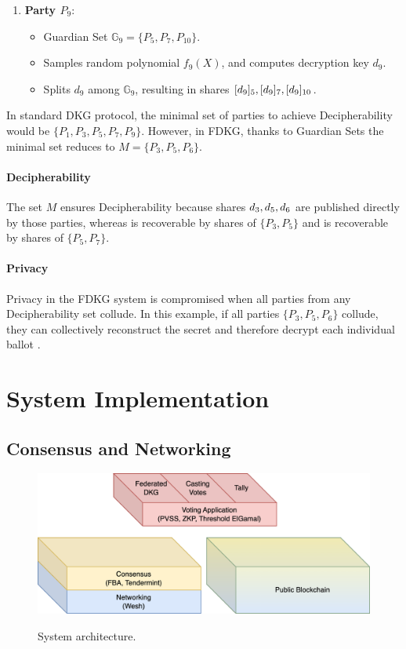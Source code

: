 \documentclass{article}
\begin{document}
\begin{enumerate}
    \item \textbf{Party $P_9$}:
    \begin{itemize}
        \item Guardian Set $\mathbb{G}_9 = \{P_5, P_7, P_{10}\}$.
        \item Samples random polynomial $f_9(X)$, and computes decryption key $d_9$.
        \item Splits $d_9$ among $\mathbb{G}_9$, resulting in shares $[d_{9}]_{5}, [d_{9}]_{7}, [d_{9}]_{10}$.
    \end{itemize}
\end{enumerate}

In standard DKG protocol, the minimal set of parties to achieve Decipherability would be \(\{P_1, P_3, P_5, P_7, P_9 \}\). However, in FDKG, thanks to Guardian Sets the minimal set reduces to \(M = \{P_3, P_5, P_6\}\).

\paragraph{Decipherability}
The set $M$ ensures Decipherability because shares $d_{3},d_{5},d_{6}$ are published directly by those parties, whereas  is recoverable by shares of \(\{P_3, P_5\}\) and  is recoverable by shares of \(\{P_5, P_7\}\).

\paragraph{Privacy}
Privacy in the FDKG system is compromised when all parties from any Decipherability set collude. In this example, if all parties \(\{P_3, P_5, P_6\}\) collude, they can collectively reconstruct the secret \DecryptionKey and therefore decrypt each individual ballot .

\section{System Implementation}

\subsection{Consensus and Networking}

\begin{figure}
    \centering
    \includegraphics[width=\textwidth]{stack-bc.png}
    \label{fig:stack-bc}
    \caption{System architecture.}
\end{figure}
\end{document}
